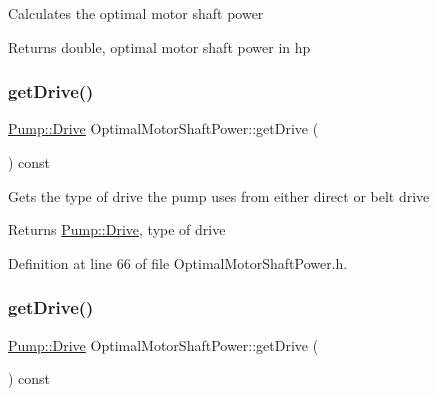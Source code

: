 Calculates the optimal motor shaft power

\begin{DoxyReturn}{Returns}
double, optimal motor shaft power in hp 
\end{DoxyReturn}
\mbox{\label{class_optimal_motor_shaft_power_a23e1045bb2e3ee62205276cbbebbc3ad}} 
\subsubsection{\texorpdfstring{get\+Drive()}{getDrive()}\hspace{0.1cm}{\footnotesize\ttfamily [1/3]}}
{\footnotesize\ttfamily \hyperlink{class_pump_a32bf0ade131a11bb3b3fb374f638e983}{Pump\+::\+Drive} Optimal\+Motor\+Shaft\+Power\+::get\+Drive (\begin{DoxyParamCaption}{ }\end{DoxyParamCaption}) const\hspace{0.3cm}{\ttfamily [inline]}}

Gets the type of drive the pump uses from either direct or belt drive

\begin{DoxyReturn}{Returns}
\hyperlink{class_pump_a32bf0ade131a11bb3b3fb374f638e983}{Pump\+::\+Drive}, type of drive 
\end{DoxyReturn}


Definition at line 66 of file Optimal\+Motor\+Shaft\+Power.\+h.

\mbox{\label{class_optimal_motor_shaft_power_a23e1045bb2e3ee62205276cbbebbc3ad}} 
\subsubsection{\texorpdfstring{get\+Drive()}{getDrive()}\hspace{0.1cm}{\footnotesize\ttfamily [2/3]}}
{\footnotesize\ttfamily \hyperlink{class_pump_a32bf0ade131a11bb3b3fb374f638e983}{Pump\+::\+Drive} Optimal\+Motor\+Shaft\+Power\+::get\+Drive (\begin{DoxyParamCaption}{ }\end{DoxyParamCaption}) const\hspace{0.3cm}{\ttfamily [inline]}}


